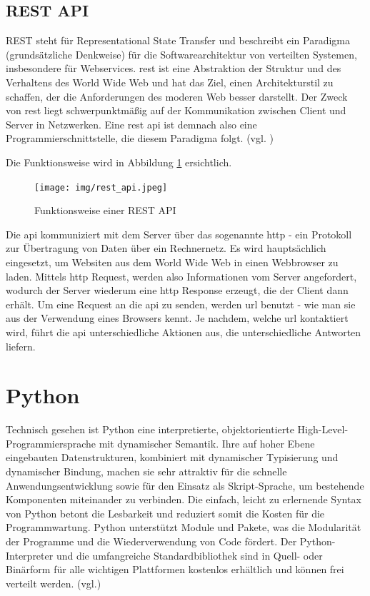 \documentclass[oneside]{ausarbeitung}
\begin{document}
\subsection{REST API}
\label{sub:rest_api}
REST steht für Representational State Transfer und beschreibt ein
Paradigma (grundsätzliche Denkweise) für die Softwarearchitektur von
verteilten Systemen, insbesondere für Webservices. \ac{rest} ist eine
Abstraktion der Struktur und des Verhaltens des World Wide Web und hat
das Ziel, einen Architekturstil zu schaffen, der die Anforderungen des
moderen Web besser darstellt. Der Zweck von \ac{rest} liegt
schwerpunktmäßig auf der Kommunikation zwischen Client und Server in
Netzwerken. Eine \ac{rest} \ac{api} ist demnach also eine
Programmierschnittstelle, die diesem Paradigma folgt. (vgl.
\cite{rest})

Die Funktionsweise wird in Abbildung \ref{fig:5} ersichtlich.

\begin{figure}[H]
  \centering
  \texttt{[image: img/rest\_api.jpeg]}
  \caption{Funktionsweise einer REST API\cite{rest_pic}}
  \label{fig:5}
\end{figure}

Die \ac{api} kommuniziert mit dem Server über das sogenannte
\ac{http} - ein Protokoll zur Übertragung von Daten über ein
Rechnernetz. Es wird hauptsächlich eingesetzt, um Websiten aus dem
World Wide Web in einen Webbrowser zu laden\cite{http_definition}.
Mittels \ac{http} Request, werden also Informationen vom Server
angefordert, wodurch der Server wiederum eine \ac{http} Response
erzeugt, die der Client dann erhält. Um eine Request an die
\ac{api} zu senden, werden \ac{url} benutzt - wie man sie aus der 
Verwendung eines Browsers kennt. Je nachdem, welche \ac{url} kontaktiert
wird, führt die \ac{api} unterschiedliche Aktionen aus, die 
unterschiedliche Antworten liefern.

\section{Python}
\label{sec:python}

Technisch gesehen ist Python eine interpretierte, objektorientierte
High-Level-Programmiersprache mit dynamischer Semantik. Ihre auf hoher
Ebene eingebauten Datenstrukturen, kombiniert mit dynamischer
Typisierung und dynamischer Bindung, machen sie sehr attraktiv für
die schnelle Anwendungsentwicklung sowie für den Einsatz als
Skript-Sprache, um bestehende Komponenten miteinander zu verbinden.
Die einfach, leicht zu erlernende Syntax von Python betont die
Lesbarkeit und reduziert somit die Kosten für die Programmwartung.
Python unterstützt Module und Pakete, was die Modularität der
Programme und die Wiederverwendung von Code fördert. Der
Python-Interpreter und die umfangreiche Standardbibliothek sind in
Quell- oder Binärform für alle wichtigen Plattformen kostenlos
erhältlich und können frei verteilt werden. 
(vgl.\cite{python_definition})
\end{document}
